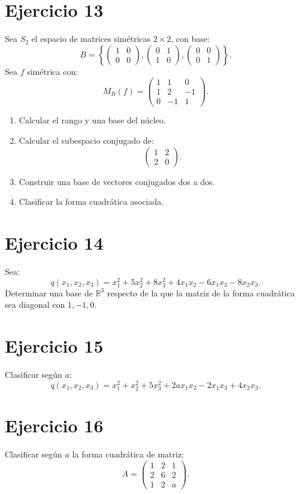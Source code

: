 \documentclass[11pt,a4paper]{article}
\newcommand{\R}{\mathbb{R}}
\begin{document}
\section{Ejercicio 13}
Sea $S_2$ el espacio de matrices simétricas $2\times2$, con base:
\[
B=
\left\{
\begin{pmatrix}1&0\\0&0\end{pmatrix},
\begin{pmatrix}0&1\\1&0\end{pmatrix},
\begin{pmatrix}0&0\\0&1\end{pmatrix}
\right\}.
\]
Sea $f$ simétrica con:
\[
M_B(f)=
\begin{pmatrix}
1&1&0\\
1&2&-1\\
0&-1&1
\end{pmatrix}.
\]
\begin{enumerate}[label=\alph*)]
\item Calcular el rango y una base del núcleo.
\item Calcular el subespacio conjugado de:
\[
\begin{pmatrix}1&2\\2&0\end{pmatrix}.
\]
\item Construir una base de vectores conjugados dos a dos.
\item Clasificar la forma cuadrática asociada.
\end{enumerate}

\section{Ejercicio 14}
Sea:
\[
q(x_1,x_2,x_3)
=
x_1^2+5x_2^2+8x_3^2
+4x_1x_2-6x_1x_3-8x_2x_3.
\]
Determinar una base de $\R^3$ respecto de la que la matriz de la forma cuadrática sea diagonal con $1,-1,0$.

\section{Ejercicio 15}
Clasificar según $a$:
\[
q(x_1,x_2,x_3)
=
x_1^2+x_2^2+5x_3^2
+2ax_1x_2-2x_1x_3+4x_2x_3.
\]

\section{Ejercicio 16}
Clasificar según $a$ la forma cuadrática de matriz:
\[
A=
\begin{pmatrix}
1&2&1\\
2&6&2\\
1&2&a
\end{pmatrix}.
\]
\end{document}
